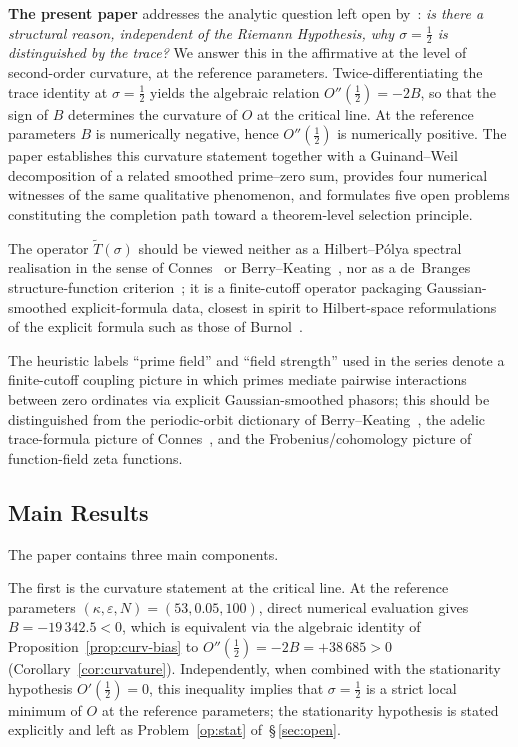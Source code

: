 \documentclass[11pt]{article}
\newcommand{\Tt}{\widetilde{T}}
\begin{document}
\textbf{The present paper} addresses the analytic question left open
by~\cite{Paper5}: \emph{is there a structural reason, independent of
the Riemann Hypothesis, why $\sigma=\tfrac12$ is distinguished by the
trace?}
We answer this in the affirmative at the level of second-order
curvature, at the reference parameters.
Twice-differentiating the trace identity at $\sigma=\tfrac12$ yields
the algebraic relation $O''(\tfrac12)=-2B$, so that the sign of $B$
determines the curvature of $O$ at the critical line.
At the reference parameters $B$ is numerically negative, hence
$O''(\tfrac12)$ is numerically positive.
The paper establishes this curvature statement together with a
Guinand--Weil decomposition of a related smoothed prime--zero sum,
provides four numerical witnesses of the same qualitative phenomenon,
and formulates five open problems constituting the completion path
toward a theorem-level selection principle.

The operator $\Tt(\sigma)$ should be viewed neither as a
Hilbert--P\'olya spectral realisation in the sense of
Connes~\cite{Connes} or Berry--Keating~\cite{BerryKeating}, nor as a
de~Branges structure-function criterion~\cite{deBranges}; it is a
finite-cutoff operator packaging Gaussian-smoothed explicit-formula
data, closest in spirit to Hilbert-space reformulations of the
explicit formula such as those of Burnol~\cite{Burnol}.

The heuristic labels ``prime field'' and ``field strength'' used in
the series denote a finite-cutoff coupling picture in which primes
mediate pairwise interactions between zero ordinates via explicit
Gaussian-smoothed phasors; this should be distinguished from the
periodic-orbit dictionary of Berry--Keating~\cite{BerryKeating},
the adelic trace-formula picture of Connes~\cite{Connes}, and the
Frobenius/cohomology picture of function-field zeta functions.

\subsection{Main Results}

The paper contains three main components.

The first is the curvature statement at the critical line.
At the reference parameters $(\kappa,\varepsilon,N)=(53,0.05,100)$,
direct numerical evaluation gives $B=-19\,342.5<0$, which is equivalent
via the algebraic identity of Proposition~\ref{prop:curv-bias} to
$O''(\tfrac12)=-2B=+38\,685>0$
(Corollary~\ref{cor:curvature}).
Independently, when combined with the stationarity hypothesis
$O'(\tfrac12)=0$, this inequality implies that $\sigma=\tfrac12$ is a
strict local minimum of $O$ at the reference parameters; the
stationarity hypothesis is stated explicitly and left as
Problem~\ref{op:stat} of~\S\,\ref{sec:open}.
\end{document}
